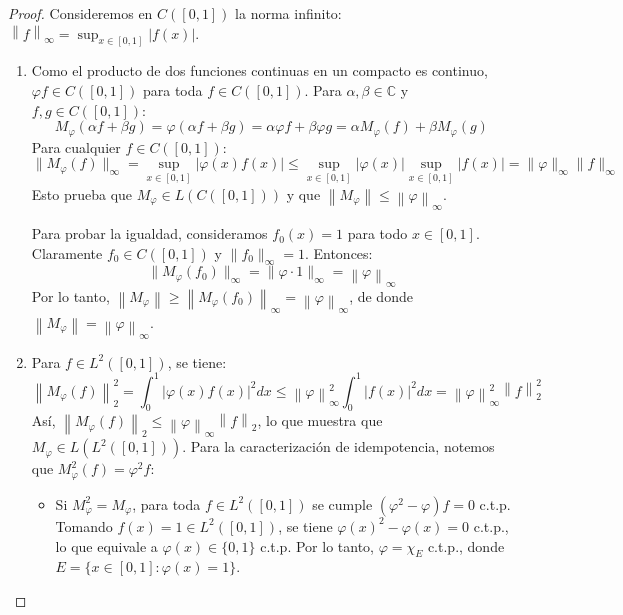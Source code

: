 \documentclass{article}
\theoremstyle{definition}
\newcommand{\C}{\mathbb{C}}
\newcommand{\norm}[1]{\left\lVert #1 \right\rVert}       %
\begin{document}
\begin{proof}
    Consideremos en \(C([0, 1])\) la norma infinito: \(\norm{f}_\infty = \sup_{x\in[0,1]} |f(x)|\).
    \begin{enumerate}
        \item Como el producto de dos funciones continuas en un compacto es continuo, \(\varphi f \in C([0,1])\) para toda \(f \in C([0,1])\). Para \( \alpha, \beta \in \C \) y \(f, g \in C([0,1])\):
              \[
                  M_\varphi(\alpha f + \beta g) = \varphi(\alpha f + \beta g) = \alpha \varphi f + \beta \varphi g = \alpha M_\varphi(f) + \beta M_\varphi(g)
              \]
              Para cualquier \(f \in C([0,1])\):
              \[
                  \|M_\varphi(f)\|_\infty = \sup_{x \in [0,1]} |\varphi(x) f(x)| \le \sup_{x \in [0,1]} |\varphi(x)| \sup_{x \in [0,1]} |f(x)| = \| \varphi \|_\infty \|f\|_\infty
              \]
              Esto prueba que \(M_\varphi \in L(C([0,1]))\) y que \( \norm{M_\varphi} \le \norm{\varphi}_\infty \).

              Para probar la igualdad, consideramos \(f_0(x) = 1\) para todo \(x \in [0,1]\). Claramente \(f_0 \in C([0,1])\) y \( \|f_0\|_\infty = 1 \). Entonces:
              \[
                  \|M_\varphi(f_0)\|_\infty = \|\varphi \cdot 1\|_\infty = \norm{\varphi}_\infty
              \]
              Por lo tanto, \(\norm{M_\varphi} \ge \norm{M_\varphi(f_0)}_\infty = \norm{\varphi}_\infty \), de donde \(\norm{M_\varphi} = \norm{\varphi}_\infty \).

        \item Para \(f \in L^2([0,1])\), se tiene:
              \[
                  \norm{M_\varphi(f)}_2^2 = \int_0^1 |\varphi(x) f(x)|^2 dx \le \norm{\varphi}_\infty^2 \int_0^1 |f(x)|^2 dx = \norm{\varphi}_\infty^2 \norm{f}_2^2
              \]
              Así, \(\norm{M_\varphi(f)}_2 \le \norm{\varphi}_\infty \norm{f}_2\), lo que muestra que \(M_\varphi \in L(L^2([0,1]))\).
              Para la caracterización de idempotencia, notemos que \(M_\varphi^2(f) = \varphi^2 f\):
              \begin{itemize}
                  \item [\((\Rightarrow)\)] Si \(M_\varphi^2 = M_\varphi \), para toda \(f \in L^2([0,1])\) se cumple \((\varphi^2 - \varphi) f = 0\) c.t.p. Tomando \(f(x) = 1 \in L^2([0,1])\), se tiene \(\varphi(x)^2 - \varphi(x) = 0\) c.t.p., lo que equivale a \( \varphi(x) \in \{0, 1\} \) c.t.p. Por lo tanto, \(\varphi = \chi_E\) c.t.p., donde \(E = \{x \in [0,1] : \varphi(x) = 1\} \).


\end{itemize}
\end{enumerate}
\end{proof}
\end{document}
